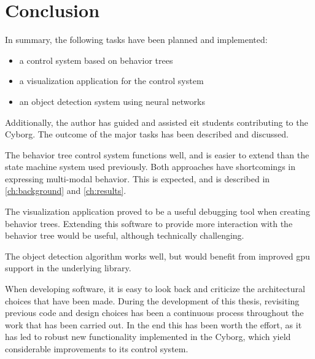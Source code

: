 \documentclass[\rootfolder/main.tex]{subfiles}
\begin{document}
\chapter{Conclusion} %
\label{ch:conclusion} %

In summary, the following tasks have been planned and implemented:

\begin{itemize}
    \item a control system based on behavior trees
    \item a visualization application for the control system
    \item an object detection system using neural networks
\end{itemize}

Additionally, the author has guided and assisted \acrshort{eit} students contributing to the Cyborg.
The outcome of the major tasks has been described and discussed.

The behavior tree control system functions well, and is easier to extend than the state machine system used previously.
Both approaches have shortcomings in expressing multi-modal behavior.
This is expected, and is described in \cref{ch:background} and \cref{ch:results}.

The visualization application proved to be a useful debugging tool when creating behavior trees.
Extending this software to provide more interaction with the behavior tree would be useful, although technically challenging.

The object detection algorithm works well, but would benefit from improved \acrshort{gpu} support in the underlying library.

When developing software, it is easy to look back and criticize the architectural choices that have been made.
During the development of this thesis, revisiting previous code and design choices has been a continuous process throughout the work that has been carried out.
In the end this has been worth the effort, as it has led to robust new functionality implemented in the Cyborg, which yield considerable improvements to its control system.
\end{document}
